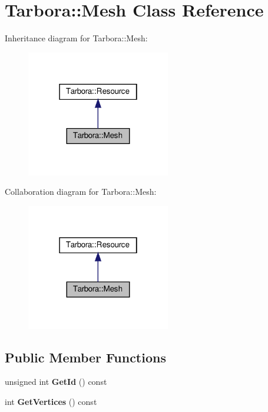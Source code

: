 \hypertarget{classTarbora_1_1Mesh}{}\section{Tarbora\+:\+:Mesh Class Reference}
\label{classTarbora_1_1Mesh}


Inheritance diagram for Tarbora\+:\+:Mesh\+:\nopagebreak
\begin{figure}[H]
\begin{center}
\leavevmode
\includegraphics[width=178pt]{classTarbora_1_1Mesh__inherit__graph}
\end{center}
\end{figure}


Collaboration diagram for Tarbora\+:\+:Mesh\+:\nopagebreak
\begin{figure}[H]
\begin{center}
\leavevmode
\includegraphics[width=178pt]{classTarbora_1_1Mesh__coll__graph}
\end{center}
\end{figure}
\subsection*{Public Member Functions}
\begin{DoxyCompactItemize}
\item 
\mbox{\label{classTarbora_1_1Mesh_ae79b3153ff4ebd7d6336ce118684b542}} 
unsigned int {\bfseries Get\+Id} () const
\item 
\mbox{\label{classTarbora_1_1Mesh_a208eb6a1cb509804f9b6e25b6592bc60}} 
int {\bfseries Get\+Vertices} () const
\end{DoxyCompactItemize}
